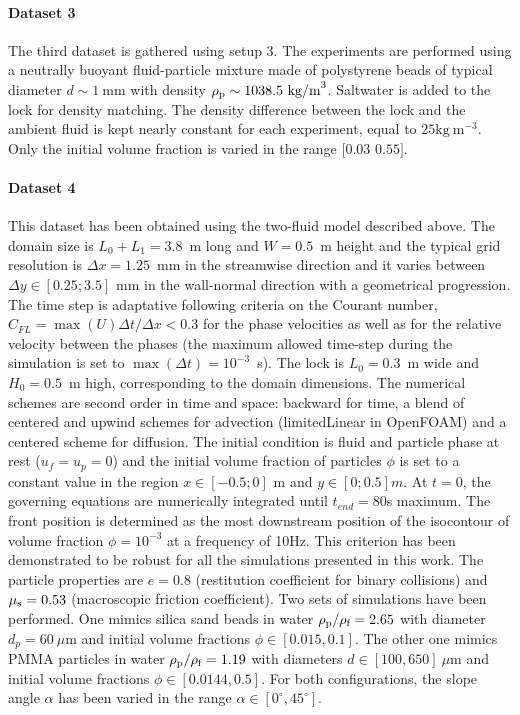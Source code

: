 \documentclass[12pt]{article}
\begin{document}
\paragraph{Dataset 3}

The third dataset is gathered using setup 3. The experiments are performed using a neutrally buoyant fluid-particle mixture made of polystyrene beads of typical diameter $d \sim 1~\textrm{mm}$ with density $\rho_{\text p} \sim 1038.5~\textrm{kg/m}^{3}$. Saltwater is added to the lock for density matching. The density difference between the lock and the ambient fluid is kept nearly constant for each experiment, equal to $25 \textrm{kg}~\textrm{m}^{-3}$. Only the initial volume fraction is varied in the range $[0.03$  $0.55]$.

\paragraph{Dataset 4}

This dataset has been obtained using the two-fluid model described above. The domain size is $L_0+L_1=3.8$~m long and $W=0.5$~m height and the typical grid resolution is $\Delta x=1.25$~mm in the streamwise direction and it varies between $\Delta y \in [0.25; 3.5]$ mm in the wall-normal direction with a geometrical progression. The time step is adaptative following criteria on the Courant number, $C_{FL}=\max(U) \Delta t / \Delta x < 0.3$ for the phase velocities as well as for the relative velocity between the phases (the maximum allowed time-step during the simulation is set to $\max(\Delta t) = 10^{-3}$~s). The lock is $L_0=0.3$~m wide and $H_0=0.5$~m high, corresponding to the domain dimensions. The numerical schemes are second order in time and space: backward for time, a blend of centered and upwind schemes for advection (limitedLinear in OpenFOAM) and a centered scheme for diffusion. The initial condition is fluid and particle phase at rest ($u_f=u_p=0$) and the initial volume fraction of particles $\phi$ is set to a constant value in the region $x\in[-0.5 ; 0]$ m and $y\in[0;0.5]m$. At $t=0$, the governing equations are numerically integrated until $t_{end}=80$s maximum. The front position is determined as the most downstream position of the isocontour of volume fraction $\phi =10^{-3}$ at a frequency of 10Hz. This criterion has been demonstrated to be robust for all the simulations presented in this work. The particle properties are $e=0.8$ (restitution coefficient for binary collisions) and $\mu_{\text s}=0.53$ (macroscopic friction coefficient). Two sets of simulations have been performed. One mimics silica sand beads in water $\rho_{\text p}/\rho_{\text f}=2.65$ with diameter $d_p=60~\mu$m and initial volume fractions $\phi\in[0.015, 0.1]$. The other one mimics PMMA particles in water $\rho_{\text p}/\rho_{\text f}=1.19$ with diameters $d \in [100, 650]~\mu$m and initial volume fractions $\phi \in [0.0144, 0.5]$. For both configurations, the slope angle $\alpha$ has been varied in the range $\alpha \in [0^\circ, 45^\circ]$.
\end{document}
